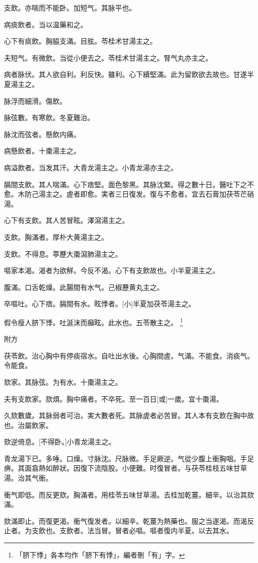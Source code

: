 \documentclass[12pt,twoside,UTF8,b5paper]{ctexbook}
\begin{document}
支飲。亦喘而不能卧。加短气。其脉平也。

病痰飲者。当以温藥和之。

心下有痰飲。胸脇支滿。目胘。苓桂术甘湯主之。

夫短气。有微飲。当從小便去之。苓桂术甘湯主之。腎气丸亦主之。

病者脉伏。其人欲自利。利反快。雖利。心下續堅滿。此为留飲欲去故也。甘遂半夏湯主之。

脉浮而細滑。傷飲。

脉弦數。有寒飲。冬夏難治。

脉沈而弦者。懸飲内痛。

病懸飲者。十棗湯主之。

病溢飲者。当发其汗。大青龙湯主之。小青龙湯亦主之。

膈間支飲。其人喘滿。心下痞堅。面色黎黑。其脉沈緊。得之數十日。醫吐下之不愈。木防己湯主之。虗者即愈。実者三日復发。復与不愈者。宜去石膏加茯苓芒硝湯。

心下有支飲。其人苦冒眩。澤瀉湯主之。

支飲。胸滿者。厚朴大黄湯主之。

支飲。不得息。葶藶大棗瀉肺湯主之。

嘔家本渴。渴者为欲觧。今反不渴。心下有支飲故也。小半夏湯主之。

腹滿。口舌乾燥。此腸間有水气。己椒藶黄丸主之。

卒嘔吐。心下痞。膈間有水。眩悸者。[小]半夏加茯苓湯主之。

假令瘦人脐下悸。吐涎沫而癲眩。此水也。五苓散主之。
	\footnote{「脐下悸」各本均作「脐下有悸」，編者刪「有」字。}

附方

茯苓飲。治心胸中有停痰宿水。自吐出水後。心胸間虗。气滿。不能食。消痰气。令能食。

欬家。其脉弦。为有水。十棗湯主之。

夫有支飲家。欬煩。胸中痛者。不卒死。至一百日[或]一歲。宜十棗湯。

久欬數歲。其脉弱者可治。実大數者死。其脉虗者必苦冒。其人本有支飲在胸中故也。治屬飲家。

欬逆倚息。[不得卧。]小青龙湯主之。

青龙湯下已。多唾。口燥。寸脉沈。尺脉微。手足厥逆。气從少腹上衝胸咽。手足痹。其面翕熱如醉狀。因復下流陰股。小便難。时復冒者。与茯苓桂枝五味甘草湯。治其气衝。

衝气即低。而反更欬。胸滿者。用桂苓五味甘草湯。去桂加乾薑。細辛。以治其欬滿。

欬滿即止。而復更渴。衝气復发者。以細辛。乾薑为熱藥也。服之当遂渴。而渴反止者。为支飲也。支飲者。法当冒。冒者必嘔。嘔者復内半夏。以去其水。
\end{document}
